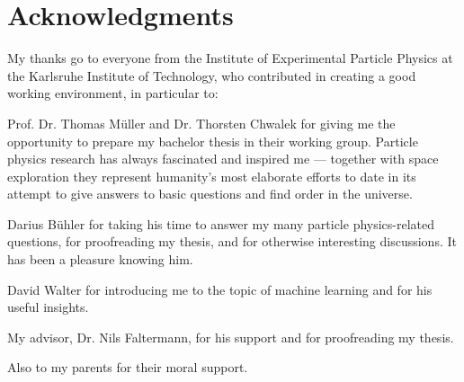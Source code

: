 \chapter*{Acknowledgments}

My thanks go to everyone from the Institute of Experimental Particle Physics at the Karlsruhe Institute of Technology, who contributed in creating a good working environment, in particular to:

Prof. Dr. Thomas Müller and Dr. Thorsten Chwalek for giving me the opportunity to prepare my bachelor thesis in their working group. Particle physics research has always fascinated and inspired me --- together with space exploration they represent humanity's most elaborate efforts to date in its attempt to give answers to basic questions and find order in the universe.

Darius Bühler for taking his time to answer my many particle physics-related questions, for proofreading my thesis, and for otherwise interesting discussions. It has been a pleasure knowing him.

David Walter for introducing me to the topic of machine learning and for his useful insights.

My advisor, Dr. Nils Faltermann, for his support and for proofreading my thesis.

Also to my parents for their moral support.